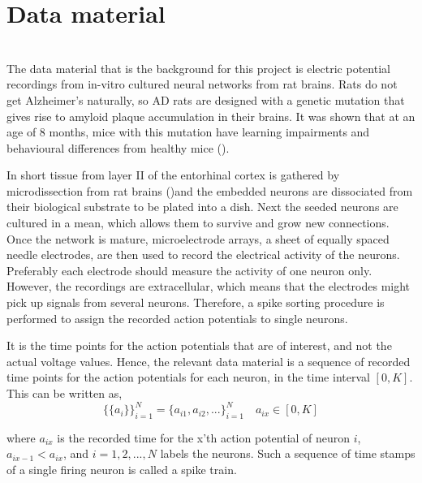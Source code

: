 \section{Data material}

\label{Lab}\\
The data material that is the background for this project is electric potential recordings from in-vitro cultured neural networks from rat brains. Rats do not get Alzheimer's naturally, so AD rats are designed with a genetic mutation that gives rise to amyloid plaque accumulation in their brains. It was shown that at an age of 8 months, mice with this mutation have learning impairments and behavioural differences from healthy mice (\cite{Radde}). 

In short tissue from layer II of the entorhinal cortex is gathered by microdissection from rat brains (\cite{Katrine})and the embedded neurons are dissociated from their biological substrate to be plated into a dish. Next the seeded neurons are cultured in a mean, which allows them to survive and grow new connections. Once the network is mature, microelectrode arrays, a sheet of equally spaced needle electrodes, are then used to record the electrical activity of the neurons. Preferably each electrode should measure the activity of one neuron only. However, the recordings are extracellular, which means that the electrodes might pick up signals from several neurons. Therefore, a spike sorting procedure is performed to assign the recorded action potentials to single neurons. 

It is the time points for the action potentials that are of interest, and not the actual voltage values. Hence, the relevant data material is a sequence of recorded time points for the action potentials for each neuron, in the time interval $[0,K]$. This can be written as, 
\begin{equation}
\label{eq:AP}
    \{\{a_i\}\}_{i=1}^{N} = \{a_{i1}, a_{i2}, ...\}_{i=1}^{N} \quad a_{ix} \in [0,K]
\end{equation}

where $a_{ix}$ is the recorded time for the x'th action potential of neuron $i$, $a_{ix-1} < a_{ix}$, and $i=1,2,...,N$ labels the neurons. Such a sequence of time stamps of a single firing neuron is called a spike train.\\






\cleardoublepage